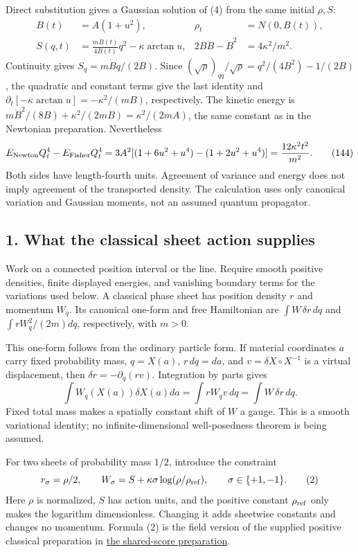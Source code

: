 \documentclass[11pt,a4paper]{article}
\begin{document}
Direct substitution gives a Gaussian solution of (4) from the same
initial \(\rho,S\): \[\begin{aligned}
B(t)&=A(1+u^2),&\rho_t&=N(0,B(t)),\\
S(q,t)&=\frac{m\dot B(t)}{4B(t)}q^2-\kappa\arctan u,&
2B\ddot B-\dot B^2&=4\kappa^2/m^2.
\end{aligned}\tag{143}\] Continuity gives \(S_q=m\dot Bq/(2B)\). Since
\((\sqrt\rho)_{qq}/\sqrt\rho=q^2/(4B^2)-1/(2B)\), the quadratic and
constant terms give the last identity and
\(\partial_t[-\kappa\arctan u]=-\kappa^2/(mB)\), respectively. The
kinetic energy is \(m\dot B^2/(8B)+\kappa^2/(2mB)=\kappa^2/(2mA)\), the
same constant as in the Newtonian preparation. Nevertheless
\[E_{\rm Newton}Q_t^4-E_{\rm Fisher}Q_t^4
 =3A^2[(1+6u^2+u^4)-(1+2u^2+u^4)]
 =\frac{12\kappa^2t^2}{m^2}.\tag{144}\] Both sides have length-fourth
units. Agreement of variance and energy does not imply agreement of the
transported density. The calculation uses only canonical variation and
Gaussian moments, not an assumed quantum propagator.

\hypertarget{what-the-classical-sheet-action-supplies}{%
\subsection{1. What the classical sheet action
supplies}\label{what-the-classical-sheet-action-supplies}}

Work on a connected position interval or the line. Require smooth
positive densities, finite displayed energies, and vanishing boundary
terms for the variations used below. A classical phase sheet has
position density \(r\) and momentum \(W_q\). Its canonical one-form and
free Hamiltonian are \(\int W\,\delta r\,dq\) and
\(\int rW_q^2/(2m)dq\), respectively, with \(m>0\).

This one-form follows from the ordinary particle form. If material
coordinates \(a\) carry fixed probability mass, \(q=X(a)\),
\(r\,dq=da\), and \(v=\delta X\circ X^{-1}\) is a virtual displacement,
then \(\delta r=-\partial_q(rv)\). Integration by parts gives
\[\int W_q(X(a))\delta X(a)da
 =\int rW_qv\,dq=\int W\,\delta r\,dq.\tag{1}\] Fixed total mass makes a
spatially constant shift of \(W\) a gauge. This is a smooth variational
identity; no infinite-dimensional well-posedness theorem is being
assumed.

For two sheets of probability mass \(1/2\), introduce the constraint
\[r_\sigma=\rho/2,\qquad
W_\sigma=S+\kappa\sigma\log(\rho/\rho_{\rm ref}),\qquad
\sigma\in\{+1,-1\}.\tag{2}\] Here \(\rho\) is normalized, \(S\) has
action units, and the positive constant \(\rho_{\rm ref}\) only makes
the logarithm dimensionless. Changing it adds sheetwise constants and
changes no momentum. Formula (2) is the field version of the supplied
positive classical preparation in
\protect\hyperlink{shared-score-preparations-and-canonical-records}{the
shared-score preparation}.
\end{document}
